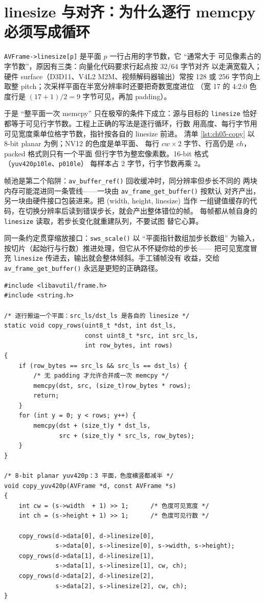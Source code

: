 \documentclass[12pt,a4paper,fontset=fandol]{ctexbook}
\newcommand{\Fn}[1]{\texttt{#1()}}
\newcommand{\Tp}[1]{\texttt{#1}}
\begin{document}
\section{linesize 与对齐：为什么逐行 memcpy 必须写成循环}

\Tp{AVFrame->linesize[p]} 是平面 \(p\) 一行占用的字节数，它 ``通常大于
可见像素占的字节数''，原因有三类：向量化代码要求行起点按 32/64 字节对齐
以走满宽载入；硬件 surface（D3D11、V4L2 M2M、视频解码器输出）常按 128
或 256 字节向上取整 pitch；次采样平面在半宽分辨率时还要把奇数宽度进位
（宽 17 的 4:2:0 色度行是 \((17+1)/2 = 9\) 字节可见，再加 padding）。

于是 ``整平面一次 memcpy'' 只在极窄的条件下成立：源与目标的
\Tp{linesize} 恰好都等于可见行字节数。工程上正确的写法是逐行循环，行数
用高度、每行字节用可见宽度乘单位格字节数，指针按各自的 linesize 前进。
清单 \ref{lst:ch05-copy} 以 8-bit planar 为例；NV12 的色度是单平面、
每行 \(cw \times 2\) 字节、行高仍是 \(ch\)，packed 格式则只有一个平面
但行字节为整宏像素数。16-bit 格式（\Tp{yuv420p10le}、\Tp{p010le}）
每样本占 2 字节，行字节数再乘 2。

帧池是第二个陷阱：\Fn{av\_buffer\_ref} 回收缓冲时，同分辨率但步长不同的
两块内存可能混进同一条管线——一块由 \Fn{av\_frame\_get\_buffer} 按默认
对齐产出，另一块由硬件接口包装进来。把 (width, height, linesize) 当作
一组键值缓存的代码，在切换分辨率后读到错误步长，就会产出整体错位的帧。
每帧都从帧自身的 \Tp{linesize} 读取，若步长变化就重建队列，不要试图
替它心算。

同一条约定贯穿缩放接口：\Fn{sws\_scale} 以 ``平面指针数组加步长数组''
为输入，按切片（起始行与行数）推进处理，但它从不怀疑你给的步长——
把可见宽度冒充 \Tp{linesize} 传进去，输出就会整体倾斜。手工铺帧没有
收益，交给 \Fn{av\_frame\_get\_buffer} 永远是更短的正确路径。

\begin{lstlisting}[style=cstyle,caption={按 AVFrame->linesize 逐平面、逐行拷贝：只有步长恰好等于可见行宽时才允许合并成一次 memcpy},label={lst:ch05-copy}]
#include <libavutil/frame.h>
#include <string.h>

/* 逐行搬运一个平面：src_ls/dst_ls 是各自的 linesize */
static void copy_rows(uint8_t *dst, int dst_ls,
                      const uint8_t *src, int src_ls,
                      int row_bytes, int rows)
{
    if (row_bytes == src_ls && src_ls == dst_ls) {
        /* 无 padding 才允许合并成一次 memcpy */
        memcpy(dst, src, (size_t)row_bytes * rows);
        return;
    }
    for (int y = 0; y < rows; y++) {
        memcpy(dst + (size_t)y * dst_ls,
               src + (size_t)y * src_ls, row_bytes);
    }
}

/* 8-bit planar yuv420p：3 平面，色度横竖都减半 */
void copy_yuv420p(AVFrame *d, const AVFrame *s)
{
    int cw = (s->width  + 1) >> 1;      /* 色度可见宽度 */
    int ch = (s->height + 1) >> 1;      /* 色度可见行数 */

    copy_rows(d->data[0], d->linesize[0],
              s->data[0], s->linesize[0], s->width, s->height);
    copy_rows(d->data[1], d->linesize[1],
              s->data[1], s->linesize[1], cw, ch);
    copy_rows(d->data[2], d->linesize[2],
              s->data[2], s->linesize[2], cw, ch);
}
\end{lstlisting}
\end{document}
